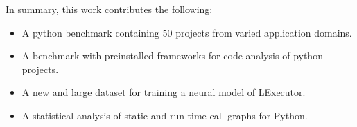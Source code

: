 In summary, this work contributes the following:
\begin{itemize}
    \item A python benchmark containing 50 projects from varied application domains.
    \item A benchmark with preinstalled frameworks for code analysis of python projects.
    \item A new and large dataset for training a neural model of LExecutor.
    \item A statistical analysis of static and run-time call graphs for Python.
\end{itemize}

